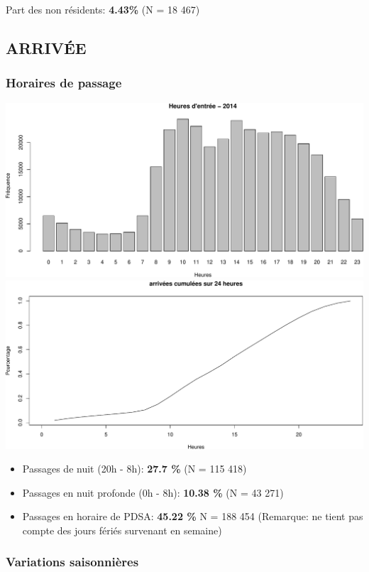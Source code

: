 \documentclass[]{article}
\begin{document}
Part des non résidents: \textbf{4.43\%} (N = 18 467)

\subsection{ARRIVÉE}\label{arrivee}

\subsubsection{Horaires de passage}\label{horaires-de-passage}

\includegraphics{Figs/horaires-1.pdf}
\includegraphics{Figs/horaires-2.pdf}

\begin{itemize}
\item
  Passages de nuit (20h - 8h): \textbf{27.7 \%} (N = 115 418)
\item
  Passages en nuit profonde (0h - 8h): \textbf{10.38 \%} (N = 43 271)
\item
  Passages en horaire de PDSA: \textbf{45.22 \%} N = 188 454 (Remarque:
  ne tient pas compte des jours fériés survenant en semaine)
\end{itemize}

\subsubsection{Variations saisonnières}\label{variations-saisonnieres}
\end{document}
